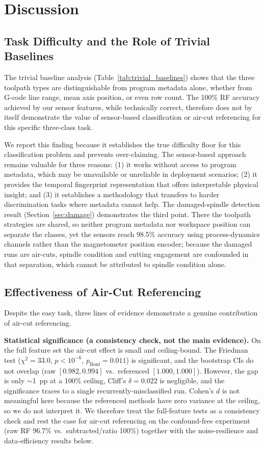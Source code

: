 \section{Discussion}\label{sec:discussion}

\subsection{Task Difficulty and the Role of Trivial Baselines}

The trivial baseline analysis (Table~\ref{tab:trivial_baselines}) shows that the three toolpath types are distinguishable from program metadata alone, whether from G-code line range, mean axis position, or even row count. The 100\% RF accuracy achieved by our sensor features, while technically correct, therefore does not by itself demonstrate the value of sensor-based classification or air-cut referencing for this specific three-class task.

We report this finding because it establishes the true difficulty floor for this classification problem and prevents over-claiming. The sensor-based approach remains valuable for three reasons: (1) it works without access to program metadata, which may be unavailable or unreliable in deployment scenarios; (2) it provides the temporal fingerprint representation that offers interpretable physical insight; and (3) it establishes a methodology that transfers to harder discrimination tasks where metadata cannot help. The damaged-spindle detection result (Section~\ref{sec:damage}) demonstrates the third point. There the toolpath strategies are shared, so neither program metadata nor workspace position can separate the classes, yet the sensors reach 98.5\% accuracy using process-dynamics channels rather than the magnetometer position encoder; because the damaged runs are air-cuts, spindle condition and cutting engagement are confounded in that separation, which cannot be attributed to spindle condition alone.

\subsection{Effectiveness of Air-Cut Referencing}

Despite the easy task, three lines of evidence demonstrate a genuine contribution of air-cut referencing.

\textbf{Statistical significance (a consistency check, not the main evidence).} On the full feature set the air-cut effect is small and ceiling-bound. The Friedman test ($\chi^2 = 33.0$, $p < 10^{-6}$, $p_{\mathrm{Bonf}} = 0.011$) is significant, and the bootstrap CIs do not overlap (raw $[0.982, 0.994]$ vs.\ referenced $[1.000, 1.000]$). However, the gap is only $\sim$1~pp at a 100\% ceiling, Cliff's $\delta = 0.022$ is negligible, and the significance traces to a single recurrently-misclassified run. Cohen's $d$ is not meaningful here because the referenced methods have zero variance at the ceiling, so we do not interpret it. We therefore treat the full-feature tests as a consistency check and rest the case for air-cut referencing on the confound-free experiment (raw RF 96.7\% vs.\ subtracted/ratio 100\%) together with the noise-resilience and data-efficiency results below.


